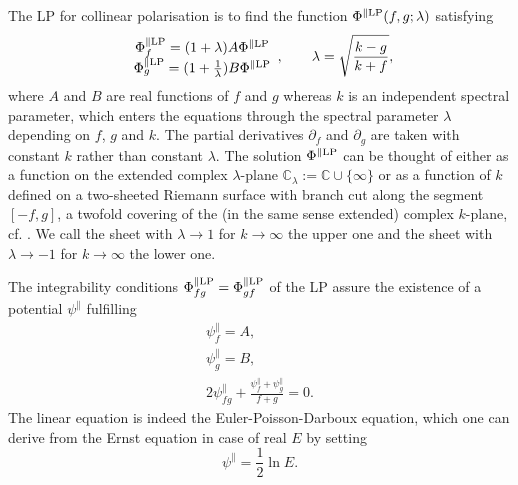 \documentclass[12pt]{iopart}
\begin{document}



The LP for collinear polarisation is to find the function $\Phi^{\|\rm LP}(f,g;\lambda)$ satisfying
\begin{eqnarray} \label{LP}
\begin{array}{c}
 \Phi_f^{\|\rm LP} =(1+\lambda)A\Phi^{\|\rm LP}\\ 
 \Phi_g^{\|\rm LP} =(1+\frac{1}{\lambda})B\Phi^{\|\rm LP}
\end{array},\quad\quad
\lambda=\sqrt{\frac{k-g}{k+f}},
\end{eqnarray}
where $A$ and $B$ are real functions of $f$ and $g$ whereas $k$ is an independent spectral parameter, which enters the equations through the spectral parameter $\lambda$ depending on $f$, $g$ and $k$. The partial derivatives $\partial_f$ and $\partial_g$ are taken with constant $k$ rather than constant $\lambda$. The solution $\Phi^{\|\rm LP}$ can be thought of either as a function on the extended complex $\lambda$-plane $\mathbb{C}_\lambda:=\mathbb{C}\cup\{\infty\}$ or as a function of $k$ defined on a two-sheeted Riemann surface with branch cut along the segment $[-f,g]$, a twofold covering of the (in the same sense extended) complex $k$-plane, cf. . We call the sheet with $\lambda\to 1$ for $k\to\infty$ the upper one and the sheet with $\lambda\to -1$ for $k\to\infty$ the lower one.

The integrability conditions $\Phi_{fg}^{\|\rm LP}=\Phi_{gf}^{\|\rm LP}$ of the LP  assure the existence of a potential $\psi^\|$ fulfilling
\begin{eqnarray}
\psi_f^\|=A, \\
\psi_g^\|=B, \\
2\psi_{fg}^\|+\frac{\psi_f^\|+\psi_g^\|}{f+g}=0. \label{linErnst}
\end{eqnarray}
The linear equation  is indeed the Euler-Poisson-Darboux equation, which one can derive from the Ernst equation in case of real $E$ by setting 
\begin{equation}
\psi^\|=\mbox{$\frac12$}\ln E. \label{DefPsippE}
\end{equation}
\end{document}
